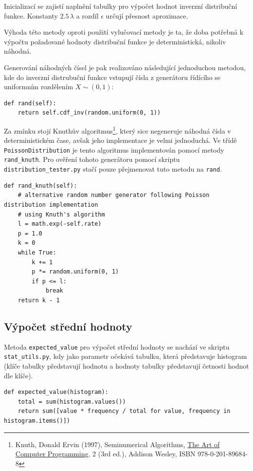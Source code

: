 \documentclass[12pt, a4paper]{article}
\begin{document}
    Inicializací se zajistí naplnění tabulky pro výpočet hodnot inverzní distribuční funkce. Konstanty $2.5\, \lambda$ a
    rozdíl $\epsilon$ určují přesnost aproximace.

    Výhoda této metody oproti použití vylučovací metody je ta, že doba potřebná k výpočtu požadované hodnoty distribuční funkce je
    deterministická, nikoliv náhodná.

    Generování náhodných čísel je pak realizováno následující jednoduchou metodou, kde do inverzní distrubuční funkce vstupují
    čísla z generátoru řídícího se uniformním rozdělením $X \sim (0, 1)$:

    \begin{lstlisting}
def rand(self):
    return self.cdf_inv(random.uniform(0, 1))
    \end{lstlisting}

    Za zmínku stojí Knuthův algoritmus\footnote{Knuth, Donald Ervin (1997), Seminumerical Algorithms, \hyperlink{https://en.wikipedia.org/wiki/The\_Art\_of\_Computer\_Programming}{The Art of Computer Programming}, 2 (3rd ed.), Addison Wesley, ISBN 978-0-201-89684-8}, který sice negeneruje náhodná čísla v deterministickém čase, avšak jeho implementace
    je velmi jednoduchá. Ve třídě \texttt{PoissonDistribution} je tento algoritmus implementován pomocí metody \texttt{rand\_knuth}.
    Pro ověření tohoto generátoru pomocí skriptu \texttt{distribution_tester.py} stačí pouze přejmenovat tuto metodu na \texttt{rand}.

    \pagebreak

    \begin{lstlisting}
def rand_knuth(self):
    # alternative random number generator following Poisson distribution implementation
    # using Knuth's algorithm
    l = math.exp(-self.rate)
    p = 1.0
    k = 0
    while True:
        k += 1
        p *= random.uniform(0, 1)
        if p <= l:
            break
    return k - 1
    \end{lstlisting}

    \subsection{Výpočet střední hodnoty}
    Metoda \texttt{expected\_value} pro výpočet střední hodnoty se nachází ve skriptu \texttt{stat\_utils.py}, kdy jako parametr očekává tabulku,
    která představuje histogram (klíče tabulky představují hodnotu a hodnoty tabulky představují četnosti hodnot dle klíče).

    \begin{lstlisting}
def expected_value(histogram):
    total = sum(histogram.values())
    return sum([value * frequency / total for value, frequency in histogram.items()])
    \end{lstlisting}
    
\end{document}

